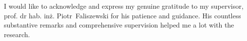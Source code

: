 
\begin{acknowledgements}      

I would like to acknowledge and express my genuine gratitude to my supervisor,
prof. dr hab. inż. Piotr~Faliszewski for his patience and guidance.
His countless substantive remarks and comprehensive supervision helped me a lot with the research.

\end{acknowledgements}

